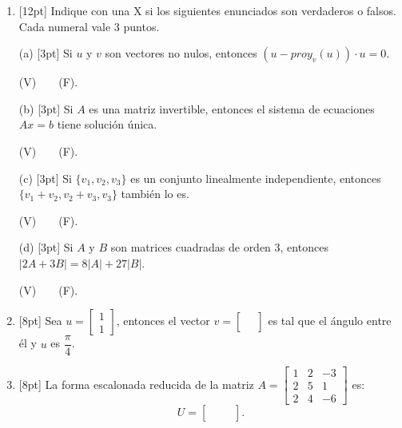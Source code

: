 \documentclass[11pt]{article}
\begin{document}
\begin{enumerate}
\item{}[12pt] Indique con una X si los siguientes enunciados son verdaderos o falsos. Cada numeral vale 3 puntos.

\vspace{6pt}
\noindent (a) [3pt] Si $u$ y $v$ son vectores no nulos, entonces $(u-proy_v(u))\cdot u = 0$.

\noindent (V)\ \ \dotfill\ \ (F).\ \ \dotfill

\vspace{6pt}
\noindent (b) [3pt] Si $A$ es una matriz invertible, entonces el sistema de ecuaciones $Ax=b$ tiene solución única.

\noindent (V)\ \ \dotfill\ \ (F).\ \ \dotfill

\vspace{6pt}
\noindent (c) [3pt] Si $\{v_1,v_2,v_3\}$ es un conjunto linealmente independiente, entonces $\{v_1+v_2,v_2+v_3,v_3\}$ también lo es.

\noindent (V)\ \ \dotfill\ \ (F).\ \ \dotfill

\vspace{6pt}
\noindent (d) [3pt] Si $A$ y $B$ son matrices cuadradas de orden 3, entonces $|2A+3B| = 8|A|+27|B|$.

\noindent (V)\ \ \dotfill\ \ (F).\ \ \dotfill

\item{}[8pt] Sea $u = \begin{bmatrix}1\\1\end{bmatrix}$, entonces el vector $v = \begin{bmatrix}\phantom{x}\\ \phantom{x}\end{bmatrix}$ es tal que el ángulo entre él y $u$ es $\dfrac{\pi}{4}$.

\vspace{4cm}

\item{}[8pt] La forma escalonada reducida de la matriz $A = \begin{bmatrix}1&2&-3\\2&5&1\\2&4&-6\end{bmatrix}$ es:
\[
U = \begin{bmatrix} & & \\ & & \\ & & \end{bmatrix}.
\]
\end{enumerate}
\end{document}
